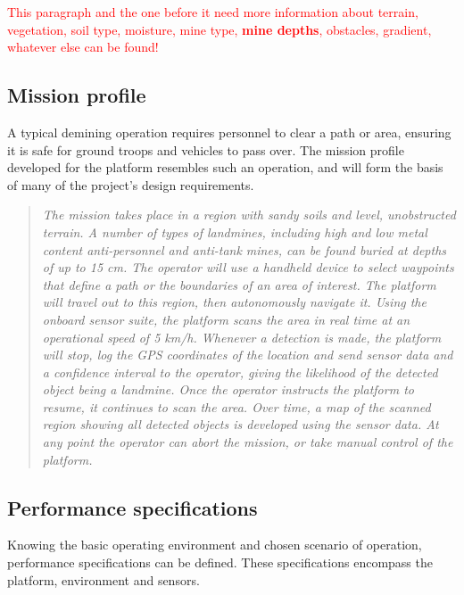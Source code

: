 \documentclass[main.tex]{subfiles}
\begin{document}
\textcolor{red}{This paragraph and the one before it need more information about terrain, vegetation, soil type, moisture, mine type, \textbf{mine depths}, obstacles, gradient, whatever else can be found!}

\subsection{Mission profile}
A typical demining operation requires personnel to clear a path or area, ensuring it is safe for ground troops and vehicles to pass over. The mission profile developed for the platform resembles such an operation, and will form the basis of many of the project's design requirements.
\begin{quote}\textit{The mission takes place in a region with sandy soils and level, unobstructed terrain. A number of types of landmines, including high and low metal content anti-personnel and anti-tank mines, can be found buried at depths of up to 15 cm. The operator will use a handheld device to select waypoints that define a path or the boundaries of an area of interest. The platform will travel out to this region, then autonomously navigate it. Using the onboard sensor suite, the platform scans the area in real time at an operational speed of 5 km/h. Whenever a detection is made, the platform will stop, log the GPS coordinates of the location  and send sensor data and a confidence interval to the operator, giving the likelihood of the detected object being a landmine. Once the operator instructs the platform to resume, it continues to scan the area. Over time, a map of the scanned region showing all detected objects is developed using the sensor data. At any point the operator can abort the mission, or take manual control of the platform.}
\end{quote}

\subsection{Performance specifications}
Knowing the basic operating environment and chosen scenario of operation, performance specifications can be defined. These specifications encompass the platform, environment and sensors.
\end{document}
